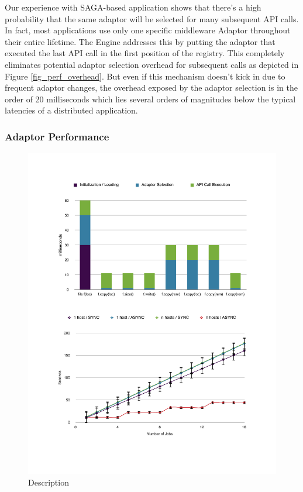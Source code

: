 Our experience with SAGA-based application shows that there’s a high probability that the same adaptor will be selected for many subsequent API calls. In fact, most applications use only one specific middleware Adaptor throughout their entire lifetime. The Engine addresses this by putting the adaptor that executed the last API call in the first position of the registry. This completely eliminates potential adaptor selection overhead for subsequent calls as depicted in Figure \ref{fig_perf_overhead}. But even if this mechanism doesn't kick in due to frequent adaptor changes, the overhead exposed by the adaptor selection is in the order of 20 milliseconds which lies several orders of magnitudes below the typical latencies of a distributed application.


\subsubsection{Adaptor Performance}\label{perf_adaptors}

\begin{figure}[!ht]
  \begin{center}
      \includegraphics[width=1\textwidth]{../figures/perf_async_1.pdf}
  \end{center}
 \up\up\up\up\up
  \caption{\small Description}
 \label{fig_perf_async}
\end{figure}

